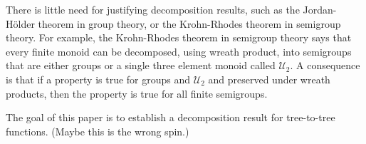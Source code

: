 There is little need for justifying decomposition results, such as the Jordan-H\"older theorem in group theory, or the Krohn-Rhodes theorem in semigroup theory. For example, the Krohn-Rhodes theorem in semigroup theory says that every finite monoid can be decomposed, using wreath product, into semigroups that are either groups or a single three element monoid called $\mathcal U_2$. A consequence is that if a  property  is true for groups and $\mathcal U_2$ and preserved under wreath products, then the property is true for all finite semigroups. 

The goal of this paper is to establish a decomposition result for tree-to-tree functions.  (Maybe this is the wrong spin.)